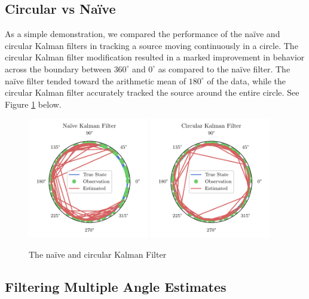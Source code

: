 \documentclass[11pt]{amsart}
\begin{document}
\subsection{Circular vs Naïve}
As a simple demonstration, we compared the performance of the naïve and circular Kalman filters in tracking a source moving continuously in a circle. The circular Kalman filter modification resulted in a marked improvement in behavior across the boundary between $360^{\circ}$ and $0^{\circ}$ as 
compared to the naïve filter. The naïve filter tended toward the arithmetic mean of $180^{\circ}$ of the data, while the circular Kalman filter accurately tracked the source around the entire circle. See Figure \ref{fig:simple_kalman} below.

\begin{figure}[htp]
    \centering
    \includegraphics[width=0.47\textwidth]{actual_paper_graphs/non_altered_kalman.pdf}\hfill
    \includegraphics[width=0.47\textwidth]{actual_paper_graphs/altered_kalman.pdf}\hfill
    \caption{The naïve and circular Kalman Filter}
    \label{fig:simple_kalman}
\end{figure}
\subsection{Filtering Multiple Angle Estimates}
\end{document}

